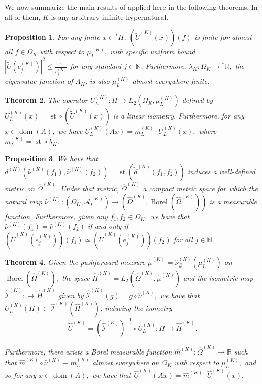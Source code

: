 \documentclass[10pt,a4paper]{amsart}
\newtheorem{thm}{Theorem}[section]
\newtheorem{prop}[thm]{Proposition}
\def \Dom{\operatorname{dom}}
\def \St{\operatorname{st}}
\def \Borel{\operatorname{Borel}}
\def \HOM{\hat{\Omega}}
\def \HMU{\hat{\mu}}
\def \HNU{\hat{\nu}}
\def \HU{\hat{U}}
\def \Hm{\hat{m}}
\begin{document}
We now summarize the main results of \cite{nonez2024spectralequivalencesnonstandardsamplings} applied here in the following theorems. In all of them, $K$ is any arbitrary infinite hypernatural. 

\begin{prop}\label{proposition_nonstandard_limited_isometry}
	For any finite $x\in {}^*H$, $(\tilde{U}^{(K)}(x))(f)$ is finite for almost all $f\in\Omega_K$ with respect to $\mu_L^{(K)},$ with specific uniform bound $|\tilde{U}(e_j^{(K)})|^2\leq\frac{1}{c_j^{(K)}}$ for any standard $j\in\mathbb{N}$. Furthermore, $\lambda_K:\Omega_K\rightarrow{}^*\mathbb{R},$ the eigenvalue function of $A_K$, is also $\mu_L^{(K)}$-almost-everywhere finite.
\end{prop}
\begin{thm}\label{theorem_nonstandard_spectral_Loeb}	
	The operator $U_L^{(K)}:H\rightarrow L_2(\Omega_K,\mu_L^{(K)})$ defined by $U_L^{(K)}(x)=\St\circ \left(\tilde{U}^{(K)}(x)\right)$  is a linear isometry. Furthermore, for any $x\in\Dom(A),$ we have $U_L^{(K)}(Ax)=m_L^{(K)}\cdot U_L^{(K)}(x),$ where $m_L^{(K)}=\St\circ\lambda_K.$
\end{thm}
\begin{prop}\label{proposition_nonstandard_hull_compact}	
	We have that $d^{(K)}(\HNU^{(K)}(f_1),\HNU^{(K)}(f_2))=\St(\tilde{d}^{(K)}(f_1,f_2))$ induces a well-defined metric on $\HOM^{(K)}.$ Under that metric, $\HOM^{(K)}$ a compact metric space for which the natural map $\HNU^{(K)}:(\Omega_K,\mathcal{A}_L^{(K)})\rightarrow(\HOM^{(K)},\Borel(\HOM^{(K)}))$ is a measurable function. Furthermore, given any $f_1,f_2\in\Omega_K,$ we have that $\HNU^{(K)}(f_1)=\HNU^{(K)}(f_2)$ if and only if $(\tilde{U}^{(K)}(e_j^{(K)}))(f_1)\simeq(\tilde{U}^{(K)}(e_j^{(K)}))(f_2)$ for all $j\in\mathbb{N}.$
\end{prop}
\begin{thm}\label{theorem_nonstandard_spectral_hull}
	Given the pushforward measure $\HMU^{(K)}=\HNU^{(K)}_{\#}(\mu_L^{(K)})$ on $\Borel(\HOM^{(K)}),$ the space $\hat{H}^{(K)}=L_2(\HOM^{(K)}, \HMU^{(K)})$ and the isometric map $\hat{\mathcal{I}}^{(K)}:\rightarrow \hat{H}^{(K)}$ given by $\hat{\mathcal{I}}^{(K)}(g)=g\circ\HNU^{(K)},$ we have that $U_L^{(K)}(H)\subset\hat{\mathcal{I}}^{(K)}(\hat{H}^{(K)})$, inducing the isometry $$\HU^{(K)}=(\hat{\mathcal{I}}^{(K)})^{-1}\circ U_L^{(K)} :H\rightarrow  \hat{H}^{(K)}.$$ 
	
	Furthermore, there exists a Borel measurable function $\Hm^{(K)}:\HOM^{(K)}\rightarrow \mathbb{R}$ such that $\Hm^{(K)}\circ\HNU^{(K)}\equiv m_L^{(K)}$ almost everywhere on $\Omega_K$ with respect to $\mu_L^{(K)},$ and so for any $x\in\Dom(A),$ we have that $\HU^{(K)}(Ax)=\Hm^{(K)}\cdot \HU^{(K)}(x).$
\end{thm}
\end{document}

